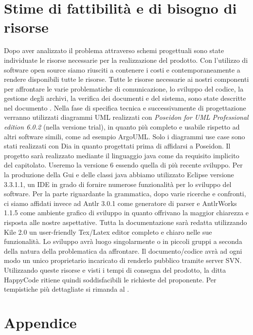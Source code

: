 \chapter{Stime di fattibilit\`a e di bisogno di risorse}
Dopo aver analizzato il problema attraverso schemi progettuali sono state individuate le risorse necessarie per la realizzazione del prodotto. Con l'utilizzo di software open source siamo riusciti a contenere i costi e contemporaneamente a rendere disponibili tutte le risorse.
Tutte le risorse necessarie ai nostri componenti per affrontare le varie problematiche di comunicazione, lo sviluppo del codice, la gestione degli archivi, la verifica dei documenti e del sistema, sono state descritte nel documento \PdQ.
Nella fase di specifica tecnica e successivamente di progettazione verranno utilizzati diagrammi UML realizzati con \textit{Poseidon for UML Professional edition 6.0.2} (nella versione trial), in quanto pi\`u completo e usabile rispetto ad altri software simili, come ad esempio ArgoUML. Solo i diagrammi use case sono stati realizzati con Dia in quanto progettati prima di affidarsi a Poseidon.
Il progetto sar\`a realizzato mediante il linguaggio java come da requisito implicito del capitolato. Useremo la versione 6 essendo quella di pi\`u recente sviluppo.
Per la produzione della Gui e delle classi java abbiamo utilizzato Eclipse versione 3.3.1.1, un IDE in grado di fornire numerose funzionalit\`a per lo sviluppo del software.
Per la parte riguardante la grammatica, dopo varie ricerche e confronti, ci siamo affidati invece ad Antlr 3.0.1 come generatore di parser e AntlrWorks 1.1.5 come ambiente grafico di sviluppo in quanto offrivano la maggior chiarezza e risposta alle nostre aspettative.
Tutta la documentazione sar\`a redatta utilizzando Kile 2.0 un user-friendly Tex/Latex editor completo e chiaro nelle sue funzionalit\`a.
Lo sviluppo avr\`a luogo singolarmente o in piccoli gruppi a seconda della natura della problematica da affrontare.
Il documento/codice avr\`a ad ogni modo un unico proprietario incaricato di renderlo pubblico tramite server SVN.
Utilizzando queste risorse e visti i tempi di consegna del prodotto, la ditta HappyCode ritiene quindi soddisfacibili le richieste del proponente.
Per tempistiche pi\`u dettagliate si rimanda al \PdP.

\chapter{Appendice}
